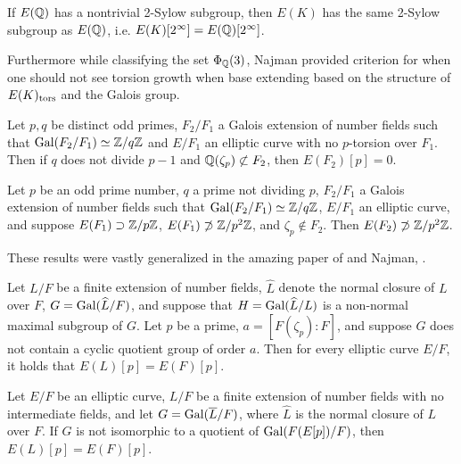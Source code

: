 \begin{lem} \label{lem:najman2sylow}
If $E(\mathbb{Q})$ has a nontrivial 2-Sylow subgroup, then $E(K)$ has the same 2-Sylow subgroup as $E(\mathbb{Q})$, i.e. $E(K)[2^\infty]= E(\mathbb{Q})[2^\infty]$. 
\end{lem}


Furthermore while classifying the set $\Phi_{\mathbb{Q}}(3)$, Najman provided criterion for when one should not see torsion growth when base extending based on the structure of $E(K)_{\text{tors}}$ and the Galois group. 


\begin{lem} \label{najmangrow1}
Let $p, q$ be distinct odd primes, $F_2/F_1$ a Galois extension of number fields such that $\operatorname{Gal}(F_2/F_1) \simeq \mathbb{Z}/q\mathbb{Z}$ and $E/F_1$ an elliptic curve with no $p$-torsion over $F_1$. Then if $q$ does not divide $p-1$ and $\mathbb{Q}(\zeta_p) \not\subset F_2$, then $E(F_2)[p]=0$. 
\end{lem}


\begin{lem} \label{najmangrow2}
Let $p$ be an odd prime number, $q$ a prime not dividing $p$, $F_2/F_1$ a Galois extension of number fields such that $\operatorname{Gal}(F_2/F_1) \simeq \mathbb{Z}/q\mathbb{Z}$, $E/F_1$ an elliptic curve, and suppose $E(F_1) \supset \mathbb{Z}/p\mathbb{Z}$, $E(F_1) \not\supset \mathbb{Z}/p^2\mathbb{Z}$, and $\zeta_p \notin F_2$. Then $E(F_2) \not\supset \mathbb{Z}/p^2\mathbb{Z}$.
\end{lem} 


These results were vastly generalized in the amazing paper of \gonjim{} and Najman, \cite{gonzalezjimeneznajman20base}.


\begin{thm} \label{thm:base1}
Let $L/F$ be a finite extension of number fields, $\widehat{L}$ denote the normal closure of $L$ over $F$, $G= \operatorname{Gal}(\widehat{L}/F)$, and suppose that $H= \operatorname{Gal}(\widehat{L}/L)$ is a non-normal maximal subgroup of $G$. Let $p$ be a prime, $a= [F(\zeta_p) \colon F]$, and suppose $G$ does not contain a cyclic quotient group of order $a$. Then for every elliptic curve $E/F$, it holds that $E(L)[p]= E(F)[p]$.
\end{thm}


\begin{thm} \label{thm:base2}
Let $E/F$ be an elliptic curve, $L/F$ be a finite extension of number fields with no intermediate fields, and let $G= \operatorname{Gal}(\overline{L}/F)$, where $\widehat{L}$ is the normal closure of $L$ over $F$. If $G$ is not isomorphic to a quotient of $\operatorname{Gal}(F(E[p])/F)$, then $E(L)[p]= E(F)[p]$.
\end{thm}


